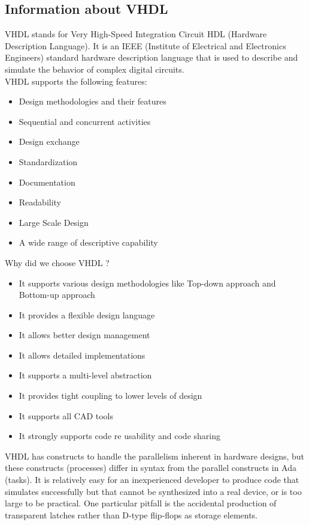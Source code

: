 \documentclass[12pt,a4paper]{article}
\begin{document}
\subsection{Information about VHDL}
VHDL stands for Very High-Speed Integration Circuit HDL (Hardware Description Language). It is an IEEE (Institute of Electrical and Electronics Engineers) standard hardware description language that is used to describe and simulate the behavior of complex digital circuits.\\
VHDL supports the following features:\
\begin{itemize}
\item Design methodologies and their features\
\item Sequential and concurrent activities \
\item Design exchange\
\item Standardization\
\item Documentation\
\item Readability\
\item Large Scale Design\
\item A wide range of descriptive capability\

\end{itemize} 

Why did we choose VHDL ? \
\begin{itemize}
\item It supports various design methodologies like Top-down approach and Bottom-up approach\
\item It provides a flexible design language\
\item It allows better design management\
\item It allows detailed implementations\
\item It supports a multi-level abstraction\
\item It provides tight coupling to lower levels of design\
\item It supports all CAD tools\
\item It strongly supports code re usability and code sharing\
\end{itemize} 

VHDL has constructs to handle the parallelism inherent in hardware designs, but these constructs (processes) differ in syntax from the parallel constructs in Ada (tasks). It is relatively easy for an inexperienced developer to produce code that simulates successfully but that cannot be synthesized into a real device, or is too large to be practical. One particular pitfall is the accidental production of transparent latches rather than D-type flip-flops as storage elements.\\
\end{document}
